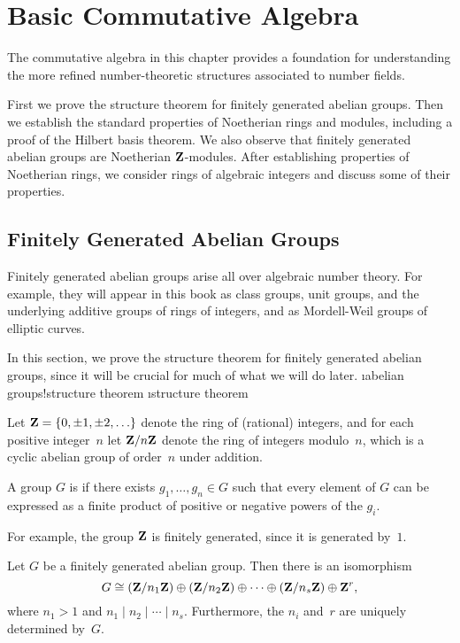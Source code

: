 \chapter{Basic Commutative Algebra}

The commutative algebra in this chapter provides a
foundation for understanding the more refined number-theoretic
structures associated to number fields.

First we prove the structure theorem for finitely generated abelian
groups.  Then we establish the standard properties of Noetherian rings
and modules, including a proof of the Hilbert basis theorem.  We also
observe that finitely generated abelian groups are Noetherian
$\mathbf{Z}$-modules.  After establishing
properties of Noetherian rings, we consider rings of algebraic
integers and discuss some of their properties.

\section{Finitely Generated Abelian Groups}\label{sec:fg}
Finitely generated abelian groups arise all over algebraic number
theory.  For example, they will appear in this book as class groups,
unit groups, and the underlying additive groups of rings of integers,
and as Mordell-Weil groups of elliptic curves.

In this section, we prove the structure theorem for finitely generated
abelian groups, since it will be crucial for much of what we will do
later.  \i{abelian groups!structure theorem} \i{structure theorem}

Let $\mathbf{Z}=\{0,\pm 1, \pm 2, \ldots\}$ denote the ring of (rational)
integers, and for each positive integer~$n$ let $\mathbf{Z}/n\mathbf{Z}$ denote the
ring of integers modulo~$n$, which is a cyclic abelian group of
order~$n$ under addition.

\begin{definition}
  A group $G$ is  if there exists
  $g_1,\ldots, g_n \in G$ such that every element of $G$ can be
  expressed as a finite product of positive or negative powers of the
  $g_i$.
\end{definition}
For example, the group $\mathbf{Z}$ is finitely generated, since it is generated
by~$1$.

\begin{theorem}\label{thm:struc}
Let $G$ be a finitely generated abelian group.  Then there is an isomorphism
$$
  G \cong (\mathbf{Z}/n_1\mathbf{Z}) \oplus (\mathbf{Z}/n_2\mathbf{Z}) \oplus \cdots \oplus
    (\mathbf{Z}/n_s\mathbf{Z}) \oplus \mathbf{Z}^{r},
$$
where $n_1>1$ and $n_1\mid{}n_2\mid{}\cdots \mid{}n_s$. 
Furthermore, the $n_i$ and~$r$ are uniquely determined by~$G$.
\end{theorem}

